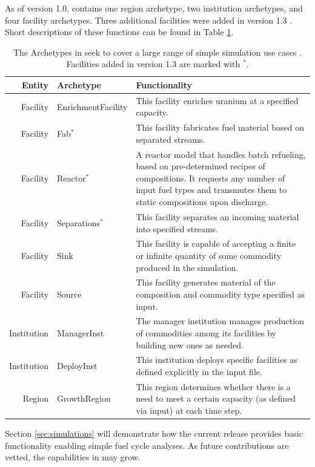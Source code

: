 As of version 1.0, \Cycamore contains one region archetype, two institution
archetypes, and four facility archetypes. Three additional facilities were
added in version 1.3 . Short descriptions of these functions can be found in
Table \ref{tab:cycamore}.


\begin{table}[H]
\centering
\begin{tabularx}{\textwidth}{|r|l|X|}
\hline
\textbf{Entity} & \textbf{Archetype} & \textbf{Functionality} \\
\hline
Facility & EnrichmentFacility & This facility enriches uranium at a specified capacity. \\
Facility & Fab$^*$ & This facility fabricates fuel material based on separated streams. \\
Facility & Reactor$^*$ & A reactor model that handles batch refueling, based on pre-determined recipes of compositions. It requests any number of input fuel types and transmutes them to static compositions upon discharge.\\
Facility & Separations$^*$ & This facility separates an incoming material into specified streams. \\
Facility & Sink & This facility is capable of accepting a finite or infinite quantity of some commodity produced in the simulation. \\
Facility & Source & This facility generates material of the composition and commodity type specified as input.  \\
Institution & ManagerInst & The manager institution manages production of commodities among its facilities by building new ones as needed. \\
Institution & DeployInst &  This institution deploys specific facilities as defined explicitly in the input file. \\
Region & GrowthRegion & This region determines whether there is a need to meet a certain capacity (as defined via input) at each time step. \\
\hline
\end{tabularx}
\caption{The Archetypes in \Cycamore seek to cover a large range of simple
simulation use cases \cite{carlsen_cycamore_2014}. Facilities added in version
1.3 are marked with $^*$.}
\label{tab:cycamore}
\end{table}

Section \ref{sec:simulations} will demonstrate how the current \Cycamore
release provides basic functionality enabling simple fuel cycle analyses. As
future contributions are vetted, the capabilities in \Cycamore may grow.

